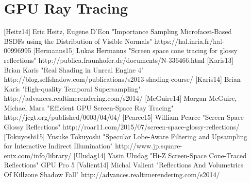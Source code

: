\section{GPU Ray Tracing}
[Heitz14] Eric Heitz, Eugene D'Eon "Importance Sampling Microfacet-Based BSDFs using the Distribution of Visible Normals" https://hal.inria.fr/hal-00996995
[Hermanns15] Lukas Hermanns "Screen space cone tracing for glossy reflections" http://publica.fraunhofer.de/documents/N-336466.html
[Karis13] Brian Karis "Real Shading in Unreal Engine 4" http://blog.selfshadow.com/publications/s2013-shading-course/
[Karis14] Brian Karis "High-quality Temporal Supersampling" http://advances.realtimerendering.com/s2014/
[McGuire14] Morgan McGuire, Michael Mara "Efficient GPU Screen-Space Ray Tracing" http://jcgt.org/published/0003/04/04/
[Pearce15] William Pearce "Screen Space Glossy Reflections" http://roar11.com/2015/07/screen-space-glossy-reflections/
[Tokuyoshi15] Yusuke Tokuyoshi "Specular Lobe-Aware Filtering and Upsampling for Interactive Indirect Illumination" http://www.jp.square-enix.com/info/library/
[Uludag14] Yasin Uludag "Hi-Z Screen-Space Cone-Traced Reflections" GPU Pro 5
[Valient14] Michal Valient "Reflections And Volumetrics Of Killzone Shadow Fall" http://advances.realtimerendering.com/s2014/
